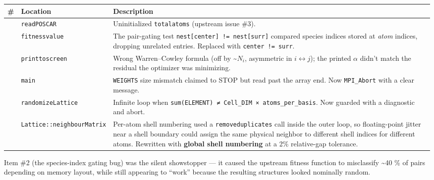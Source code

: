 \documentclass[
  11pt,
]{article}
\begin{document}
\begin{longtable}[]{@{}
  >{\raggedright\arraybackslash}p{}
  >{\raggedright\arraybackslash}p{}
  >{\raggedright\arraybackslash}p{}@{}}
\toprule\noalign{}
\begin{minipage}[b]{\linewidth}\raggedright
\#
\end{minipage} & \begin{minipage}[b]{\linewidth}\raggedright
Location
\end{minipage} & \begin{minipage}[b]{\linewidth}\raggedright
Description
\end{minipage} \\
\midrule\noalign{}
\endhead
\bottomrule\noalign{}
\endlastfoot
1 & \texttt{readPOSCAR} & Uninitialized \texttt{totalatoms} (upstream
issue \#3). \\
2 & \texttt{fitnessvalue} & The pair-gating test
\texttt{nest{[}center{]}\ !=\ nest{[}surr{]}} compared species indices
stored at \emph{atom} indices, dropping unrelated entries. Replaced with
\texttt{center\ !=\ surr}. \\
3 & \texttt{printtoscreen} & Wrong Warren--Cowley formula (off by
\textasciitilde{}\(N_i\), asymmetric in \(i \leftrightarrow j\)); the
printed \(\alpha\) didn't match the residual the optimizer was
minimizing. \\
4 & \texttt{main} & \texttt{WEIGHTS} size mismatch claimed to STOP but
read past the array end. Now \texttt{MPI\_Abort} with a clear
message. \\
5 & \texttt{randomizeLattice} & Infinite loop when
\texttt{sum(ELEMENT)\ ≠\ Cell\_DIM\ ×\ atoms\_per\_basis}. Now guarded
with a diagnostic and abort. \\
6 & \texttt{Lattice::neighbourMatrix} & Per-atom shell numbering used a
\texttt{removeduplicates} call inside the outer loop, so floating-point
jitter near a shell boundary could assign the same physical neighbor to
different shell indices for different atoms. Rewritten with
\textbf{global shell numbering} at a 2\% relative-gap tolerance. \\
\end{longtable}

Item \#2 (the species-index gating bug) was the silent showstopper ---
it caused the upstream fitness function to misclassify \textasciitilde40
\% of pairs depending on memory layout, while still appearing to
``work'' because the resulting structures looked nominally random.
\end{document}
